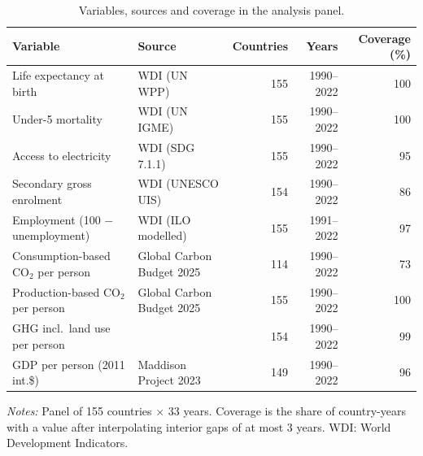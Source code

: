 \begin{table}[tbp]
\centering
\small
\setlength{\tabcolsep}{3pt}
\caption{Variables, sources and coverage in the analysis panel.}
\label{tab:data}
\begin{threeparttable}
\begin{tabular}{llrrr}
\toprule
Variable & Source & Countries & Years & Coverage (\%) \\
\midrule
Life expectancy at birth & WDI (UN WPP) & 155 & 1990--2022 & 100 \\
Under-5 mortality & WDI (UN IGME) & 155 & 1990--2022 & 100 \\
Access to electricity & WDI (SDG 7.1.1) & 155 & 1990--2022 & 95 \\
Secondary gross enrolment & WDI (UNESCO UIS) & 154 & 1990--2022 & 86 \\
Employment (100 $-$ unemployment) & WDI (ILO modelled) & 155 & 1991--2022 & 97 \\
Consumption-based CO$_2$ per person & Global Carbon Budget 2025 & 114 & 1990--2022 & 73 \\
Production-based CO$_2$ per person & Global Carbon Budget 2025 & 155 & 1990--2022 & 100 \\
GHG incl.\ land use per person & \citet{jones2023} & 154 & 1990--2022 & 99 \\
GDP per person (2011 int.\$) & Maddison Project 2023 & 149 & 1990--2022 & 96 \\
\bottomrule
\end{tabular}
\begin{tablenotes}[flushleft]
\footnotesize
\item \textit{Notes:} Panel of 155 countries $\times$ 33 years. Coverage is the share of country-years with a value after interpolating interior gaps of at most 3 years. WDI: World Development Indicators.
\end{tablenotes}
\end{threeparttable}
\end{table}
